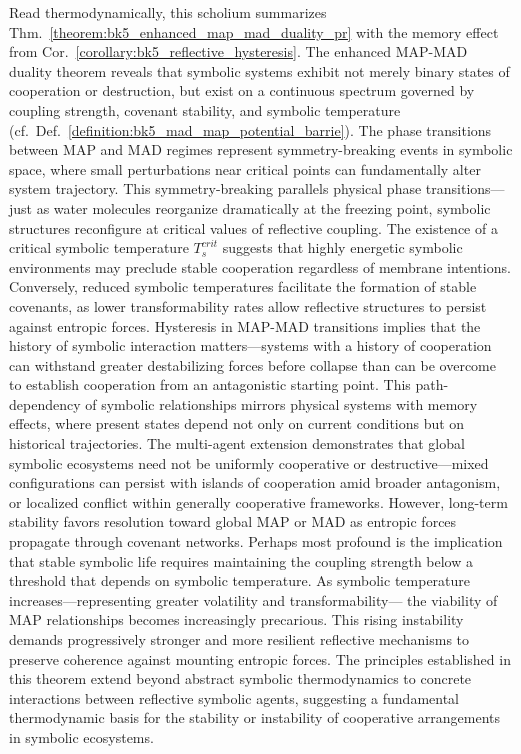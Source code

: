 \begin{scholium}
\label{scholium:bk5_mutually_assured_continuous_progress}
Read thermodynamically, this scholium summarizes Thm.~\ref{theorem:bk5_enhanced_map_mad_duality_pr} with the memory effect from Cor.~\ref{corollary:bk5_reflective_hysteresis}.
The enhanced MAP-MAD duality theorem reveals that symbolic systems exhibit not merely binary states of cooperation or destruction, but exist on a continuous spectrum governed by coupling strength, covenant stability, and symbolic temperature (cf.~Def.~\ref{definition:bk5_mad_map_potential_barrie}). 
The phase transitions between MAP and MAD regimes represent symmetry-breaking events in symbolic space, where small perturbations near critical points can fundamentally alter system trajectory. This symmetry-breaking parallels physical phase transitions—just as water molecules reorganize dramatically at the freezing point, symbolic structures reconfigure at critical values of reflective coupling.
The existence of a critical symbolic temperature $T_s^{crit}$ suggests that highly energetic symbolic environments may preclude stable cooperation regardless of membrane intentions. Conversely, reduced symbolic temperatures facilitate the formation of stable covenants, as lower transformability rates allow reflective structures to persist against entropic forces.
Hysteresis in MAP-MAD transitions implies that the history of symbolic interaction matters—systems with a history of cooperation can withstand greater destabilizing forces before collapse than can be overcome to establish cooperation from an antagonistic starting point. This path-dependency of symbolic relationships mirrors physical systems with memory effects, where present states depend not only on current conditions but on historical trajectories.
The multi-agent extension demonstrates that global symbolic ecosystems need not be uniformly cooperative or destructive—mixed configurations can persist with islands of cooperation amid broader antagonism, or localized conflict within generally cooperative frameworks. However, long-term stability favors resolution toward global MAP or MAD as entropic forces propagate through covenant networks.
Perhaps most profound is the implication that stable symbolic life requires maintaining 
the coupling strength below a threshold that depends on symbolic temperature.
As symbolic temperature increases—representing greater volatility and transformability—
the viability of MAP relationships becomes increasingly precarious. 
This rising instability demands progressively stronger and more resilient reflective mechanisms 
to preserve coherence against mounting entropic forces.
The principles established in this theorem extend beyond abstract symbolic thermodynamics to concrete interactions between reflective symbolic agents, suggesting a fundamental thermodynamic basis for the stability or instability of cooperative arrangements in symbolic ecosystems.
\end{scholium}
